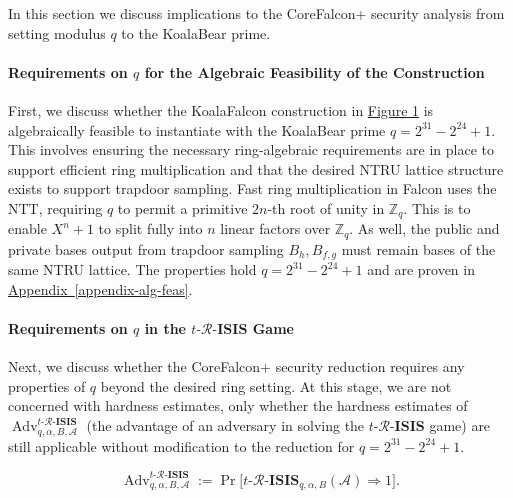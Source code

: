 In this section we discuss implications to the CoreFalcon+ security analysis from
setting modulus $q$ to the KoalaBear prime. 

\paragraph{Requirements on $q$ for the Algebraic Feasibility of the Construction}

First, we discuss whether the KoalaFalcon construction in \hyperref[koalafalcon-construction]{Figure 1} 
is algebraically feasible to instantiate with the KoalaBear prime \(q = 2^{31} - 2^{24} + 1\). This involves ensuring 
the necessary ring-algebraic requirements are in place to support efficient ring multiplication 
and that the desired NTRU lattice structure exists to support trapdoor sampling. Fast ring 
multiplication in Falcon uses the NTT, requiring \(q\) to permit a primitive \(2n\)-th root of 
unity in \(\mathbb{Z}_q\). This is to enable \(X^n + 1\) to split fully into \(n\) linear factors 
over \(\mathbb{Z}_q\). As well, the public and private bases output from trapdoor sampling 
\(B_h, B_{f,g}\) must remain bases of the same NTRU lattice. The properties hold \(q = 2^{31} - 2^{24} + 1\) 
and are proven in \hyperref[appendix-alg-feas]{Appendix~\ref*{appendix-alg-feas}}.

\paragraph{Requirements on $q$ in the $t\text{-}\mathcal{R}\text{-}\mathbf{ISIS}$ Game}

Next, we discuss whether the CoreFalcon+ security reduction requires any properties of \(q\) beyond 
the desired ring setting. At this stage, we are not concerned with hardness estimates, only 
whether the hardness estimates of $\operatorname{Adv}_{q,\alpha,B,\mathcal{A}}^{t\text{-}\mathcal{R}\text{-}\mathbf{ISIS}}$ 
(the advantage of an adversary in solving the $t\text{-}\mathcal{R}\text{-}\mathbf{ISIS}$ game) are
still applicable without modification to the reduction for $q=2^{31} - 2^{24} + 1$.

\[
\operatorname{Adv}_{q,\alpha,B,\mathcal{A}}^{t\text{-}\mathcal{R}\text{-}\mathbf{ISIS}}
:=
\Pr\!\bigl[t\text{-}\mathcal{R}\text{-}\mathbf{ISIS}_{q,\alpha,B}(\mathcal{A}) \Rightarrow 1\bigr].
\]

